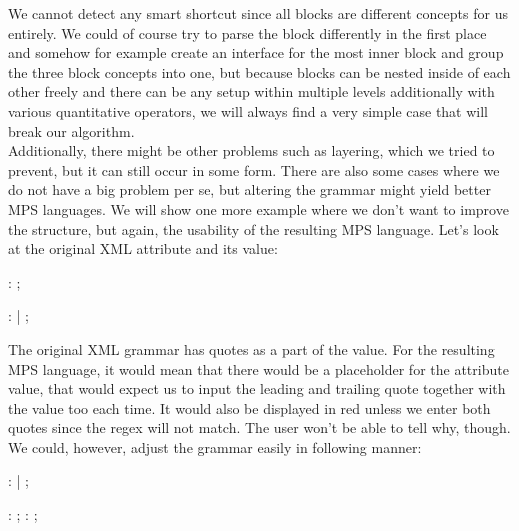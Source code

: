 We cannot detect any smart shortcut since all blocks are different concepts for us entirely. We could of course try to parse the block differently in the first place and somehow for example create an interface for the most inner block and group the three block concepts into one, but because blocks can be nested inside of each other freely and there can be any setup within multiple levels additionally with various quantitative operators, we will always find a very simple case that will break our algorithm. 
\\

Additionally, there might be other problems such as layering, which we tried to prevent, but it can still occur in some form. There are also some cases where we do not have a big problem per se, but altering the grammar might yield better MPS languages. We will show one more example where we don't want to improve the structure, but again, the usability of the resulting MPS language. Let's look at the original XML attribute and its value:

\begin{antlr}
	   :    \literal{=}  ;
	
	      :    \regex{~["]*} 
	            |    \regex{~[']*} 
	            ;	
\end{antlr}

The original XML grammar has quotes as a part of the value. For the resulting MPS language, it would mean that there would be a placeholder for the attribute value, that would expect us to input the leading and trailing quote together with the value too each time. It would also be displayed in red unless we enter both quotes since the regex will not match. The user won't be able to tell why, though. We could, however, adjust the grammar easily in following manner:

\begin{antlr}
	   :       
	            |       
	            ;
	
	       :   \regex{~["]*} ;
	       :   \regex{~[']*} ;
\end{antlr}

